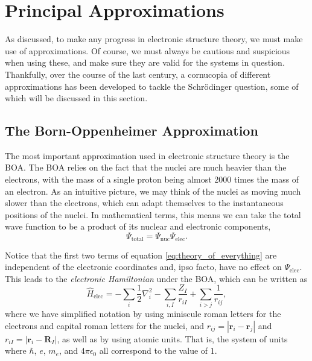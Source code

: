 \section{Principal Approximations}

As discussed, to make any progress in electronic structure theory, we must make use of approximations. Of course, we must always be cautious and suspicious when using these, and make sure they are valid for the systems in question. Thankfully, over the course of the last century, a cornucopia of different approximations has been developed to tackle the Schr\"odinger question, some of which will be discussed in this section.

\subsection{The Born-Oppenheimer Approximation}

The most important approximation used in electronic structure theory is the \gls{BOA}.\cite{bornZur1927} The \gls{BOA} relies on the fact that the nuclei are much heavier than the electrons, with the mass of a single proton being almost 2000 times the mass of an electron. As an intuitive picture, we may think of the nuclei as moving much slower than the electrons, which can adapt themselves to the instantaneous positions of the nuclei. In mathematical terms, this means we can take the total wave function to be a product of its nuclear and electronic components,
\begin{equation}
    \Psi_\mathrm{total} = \Psi_\mathrm{nuc} \Psi_\mathrm{elec}.
\end{equation}

Notice that the first two terms of equation \ref{eq:theory_of_everything} are independent of the electronic coordinates and, ipso facto, have no effect on $\Psi_\mathrm{elec}$. This leads to the \emph{electronic Hamiltonian} under the \gls{BOA}, which can be written as
\begin{equation}
\label{eq:elec_hamiltonian}
\hat H_\mathrm{elec} = -\sum_{i} \frac{1}{2} \nabla_i^2 - \sum_{i,I} \frac{Z_I}{r_{iI}} + \sum_{i\gt j} \frac{1}{r_{ij}},
\end{equation}
where we have simplified notation by using miniscule roman letters for the electrons and capital roman letters for the nuclei, and $r_{ij}=|\mathbf{r}_i-\mathbf{r}_j|$ and $r_{iI}=|\mathbf{r}_i-\mathbf{R}_I|$, as well as by using atomic units. That is, the system of units where $\hbar$, $e$, $m_e$, and $4\pi\epsilon_0$ all correspond to the value of $1$.

